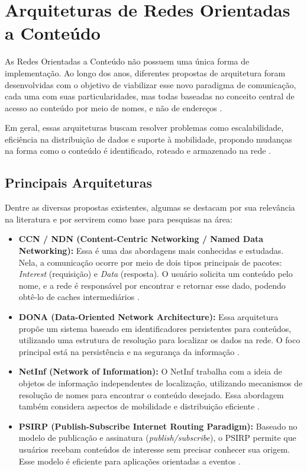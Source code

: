 \documentclass[12pt]{article}
\begin{document}
\section{Arquiteturas de Redes Orientadas a Conteúdo}

As Redes Orientadas a Conteúdo não possuem uma única forma de implementação. Ao longo dos anos, diferentes propostas de arquitetura foram desenvolvidas com o objetivo de viabilizar esse novo paradigma de comunicação, cada uma com suas particularidades, mas todas baseadas no conceito central de acesso ao conteúdo por meio de nomes, e não de endereços \cite{bvm12}.

Em geral, essas arquiteturas buscam resolver problemas como escalabilidade, eficiência na distribuição de dados e suporte à mobilidade, propondo mudanças na forma como o conteúdo é identificado, roteado e armazenado na rede \cite{ambiel2013redes}.

\subsection{Principais Arquiteturas}

Dentre as diversas propostas existentes, algumas se destacam por sua relevância na literatura e por servirem como base para pesquisas na área:

\begin{itemize}

\item \textbf{CCN / NDN (Content-Centric Networking / Named Data Networking):}
Essa é uma das abordagens mais conhecidas e estudadas. Nela, a comunicação ocorre por meio de dois tipos principais de pacotes: \textit{Interest} (requisição) e \textit{Data} (resposta). O usuário solicita um conteúdo pelo nome, e a rede é responsável por encontrar e retornar esse dado, podendo obtê-lo de caches intermediários \cite{jacobson2009networking}.

\item \textbf{DONA (Data-Oriented Network Architecture):}
Essa arquitetura propõe um sistema baseado em identificadores persistentes para conteúdos, utilizando uma estrutura de resolução para localizar os dados na rede. O foco principal está na persistência e na segurança da informação \cite{bvm12}.

\item \textbf{NetInf (Network of Information):}
O NetInf trabalha com a ideia de objetos de informação independentes de localização, utilizando mecanismos de resolução de nomes para encontrar o conteúdo desejado. Essa abordagem também considera aspectos de mobilidade e distribuição eficiente \cite{bvm12}.

\item \textbf{PSIRP (Publish-Subscribe Internet Routing Paradigm):}
Baseado no modelo de publicação e assinatura (\textit{publish/subscribe}), o PSIRP permite que usuários recebam conteúdos de interesse sem precisar conhecer sua origem. Esse modelo é eficiente para aplicações orientadas a eventos \cite{bvm12}.

\end{itemize}
\end{document}
